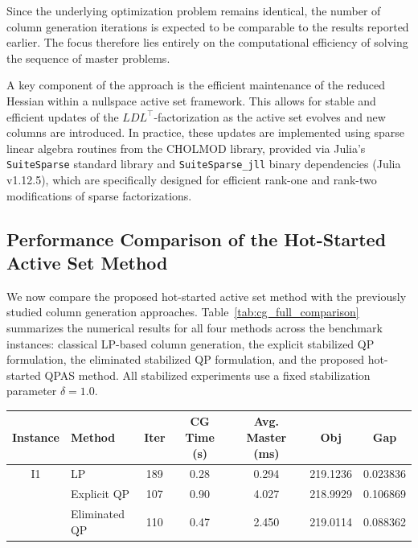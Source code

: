 \documentclass{book}
\theoremstyle{definition}
\numberwithin{algorithm_}{chapter}
\begin{document}
{\bigskip

Since the underlying optimization problem remains identical, the number of column generation iterations is expected to be comparable to the results reported earlier. The focus therefore lies entirely on the computational efficiency of solving the sequence of master problems.

\bigskip

A key component of the approach is the efficient maintenance of the reduced Hessian within a nullspace active set framework. This allows for stable and efficient updates of the \(LDL^\top\)-factorization as the active set evolves and new columns are introduced. In practice, these updates are implemented using sparse linear algebra routines from the \textsc{CHOLMOD} library, provided via Julia's \texttt{SuiteSparse} standard library and \texttt{SuiteSparse\_jll} binary dependencies (Julia v1.12.5), which are specifically designed for efficient rank-one and rank-two modifications of sparse factorizations.


\subsection{Performance Comparison of the Hot-Started Active Set Method}

We now compare the proposed hot-started active set method with the previously studied column generation approaches. Table~\ref{tab:cg_full_comparison} summarizes the numerical results for all four methods across the benchmark instances: classical LP-based column generation, the explicit stabilized QP formulation, the eliminated stabilized QP formulation, and the proposed hot-started QPAS method. All stabilized experiments use a fixed stabilization parameter $\delta = 1.0$.

\begin{table}[ht]
\centering
\small

\renewcommand{\arraystretch}{1.2}

\begin{tabular}{c l c c c c c}
\hline
Instance & Method & Iter & CG Time (s) & Avg. Master (ms) & Obj & Gap \\
\hline

I1
& LP
& 189
& 0.28
& 0.294
& 219.1236
& 0.023836 \\

& Explicit QP
& 107
& 0.90
& 4.027
& 218.9929
& 0.106869 \\

& Eliminated QP
& 110
& 0.47
& 2.450
& 219.0114
& 0.088362 \\


\end{tabular}
\end{table}}
\end{document}
